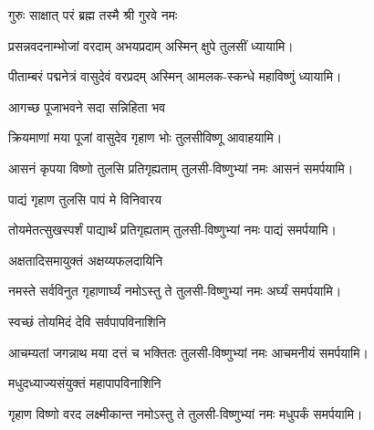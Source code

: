 
{गुरुः साक्षात् परं ब्रह्म तस्मै श्री गुरवे नमः}

\begin{center}

{प्रसन्नवदनाम्भोजां वरदाम् अभयप्रदाम्}
\hfill अस्मिन् क्षुपे तुलसीं ध्यायामि।

{पीताम्बरं पद्मनेत्रं वासुदेवं वरप्रदम्}
\hfill{}अस्मिन् आमलक-स्कन्धे महाविष्णुं ध्यायामि।

{आगच्छ पूजाभवने सदा सन्निहिता भव}

{क्रियमाणां मया पूजां वासुदेव गृहाण भोः} 
\hfill{}तुलसीविष्णू आवाहयामि।

{आसनं कृपया विष्णो तुलसि प्रतिगृह्यताम्}
\hfill{}तुलसी-विष्णुभ्यां नमः आसनं समर्पयामि।

{पाद्यं गृहाण तुलसि पापं मे विनिवारय}

{तोयमेतत्सुखस्पर्शं पाद्यार्थं प्रतिगृह्यताम्}
\hfill{}तुलसी-विष्णुभ्यां नमः पाद्यं समर्पयामि।

{अक्षतादिसमायुक्तं अक्षय्यफलदायिनि}

{नमस्ते सर्वविनुत गृहाणार्घ्यं नमोऽस्तु ते}
\hfill{} तुलसी-विष्णुभ्यां नमः अर्घ्यं समर्पयामि।

\begin{minipage}{\linewidth}

{स्वच्छं तोयमिदं देवि सर्वपापविनाशिनि}

{आचम्यतां जगन्नाथ मया दत्तं च भक्तितः}
\hfill{}तुलसी-विष्णुभ्यां नमः आचमनीयं समर्पयामि।
\end{minipage}

{मधुदध्याज्यसंयुक्तं महापापविनाशिनि}

{गृहाण विष्णो वरद लक्ष्मीकान्त नमोऽस्तु ते}
\hfill{}तुलसी-विष्णुभ्यां नमः मधुपर्कं समर्पयामि।


\end{center}
